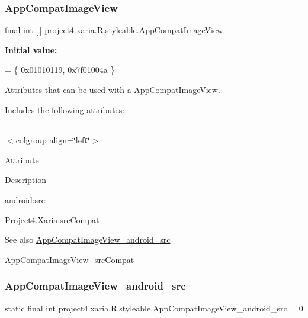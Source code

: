 \subsubsection{\texorpdfstring{App\+Compat\+Image\+View}{AppCompatImageView}}
{\footnotesize\ttfamily final int \mbox{[}$\,$\mbox{]} project4.\+xaria.\+R.\+styleable.\+App\+Compat\+Image\+View\hspace{0.3cm}{\ttfamily [static]}}

{\bfseries Initial value\+:}
\begin{DoxyCode}
= \{
            0x01010119, 0x7f01004a
        \}
\end{DoxyCode}
Attributes that can be used with a App\+Compat\+Image\+View. 

Includes the following attributes\+:

\tabulinesep=1mm
\begin{longtabu} spread 0pt [c]{*{0}{|X[-1]}|}
\hline
\end{longtabu}
$<$colgroup align=\char`\"{}left\char`\"{}$>$ 

Attribute

Description 

{\ttfamily \hyperlink{classproject4_1_1xaria_1_1R_1_1styleable_a15e13bb5555b9754004dda300412ef26}{android\+:src}}

{\ttfamily \hyperlink{classproject4_1_1xaria_1_1R_1_1styleable_a604f27dd13923b0ff25a57688e6688eb}{Project4.\+Xaria\+:src\+Compat}}

\begin{DoxySeeAlso}{See also}
\hyperlink{classproject4_1_1xaria_1_1R_1_1styleable_a15e13bb5555b9754004dda300412ef26}{App\+Compat\+Image\+View\+\_\+android\+\_\+src} 

\hyperlink{classproject4_1_1xaria_1_1R_1_1styleable_a604f27dd13923b0ff25a57688e6688eb}{App\+Compat\+Image\+View\+\_\+src\+Compat} 
\end{DoxySeeAlso}
\mbox{\label{classproject4_1_1xaria_1_1R_1_1styleable_a15e13bb5555b9754004dda300412ef26}} 
\subsubsection{\texorpdfstring{App\+Compat\+Image\+View\+\_\+android\+\_\+src}{AppCompatImageView\_android\_src}}
{\footnotesize\ttfamily static final int project4.\+xaria.\+R.\+styleable.\+App\+Compat\+Image\+View\+\_\+android\+\_\+src = 0\hspace{0.3cm}{\ttfamily [static]}}

